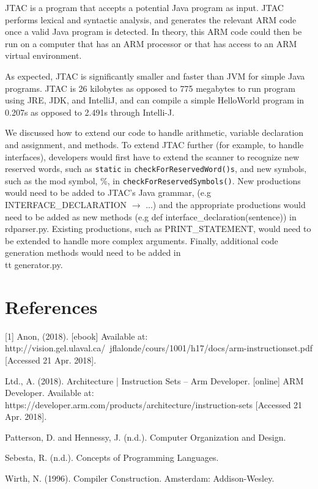 \documentclass[11pt]{article}
\begin{document}
JTAC is a program that accepts a potential Java program as input. JTAC performs lexical and syntactic analysis, and generates the relevant ARM code once a valid Java program is detected. In theory, this ARM code could then be run on a computer that has an ARM processor or that has access to an ARM virtual environment.

\bigskip
As expected, JTAC is significantly smaller and faster than JVM for simple Java programs. JTAC is 26 kilobytes as opposed to 775 megabytes to run program using JRE, JDK, and IntelliJ, and can compile a simple HelloWorld program in 0.207s as opposed to 2.491s through Intelli-J.

\bigskip
We discussed how to extend our code to handle arithmetic, variable declaration and assignment, and methods. To extend JTAC further (for example, to handle interfaces), developers would first have to extend the scanner to recognize new reserved words, such as {\tt static} in {\tt checkForReservedWord()s}, and new symbols, such as the mod symbol, \%, in {\tt checkForReservedSymbols()}. New productions would need to be added to JTAC’s Java grammar, (e.g INTERFACE\_DECLARATION $\rightarrow$ ...) and the appropriate productions would need to be added as new methods (e.g def interface\_declaration(sentence)) in rdparser.py. Existing productions, such as PRINT\_STATEMENT, would need to be extended to handle more complex arguments. Finally, additional code generation methods would need to be added in {\\tt generator.py}.

\newpage
\newpage

\section*{References}

[1] Anon, (2018). [ebook] Available at: http://vision.gel.ulaval.ca/~jflalonde/cours/1001/h17/docs/arm-instructionset.pdf [Accessed 21 Apr. 2018].

\bigskip
[2] Ltd., A. (2018). Architecture | Instruction Sets – Arm Developer. [online] ARM Developer. Available at: https://developer.arm.com/products/architecture/instruction-sets [Accessed 21 Apr. 2018].

\bigskip
[3] Patterson, D. and Hennessy, J. (n.d.). Computer Organization and Design.

\bigskip
[4] Sebesta, R. (n.d.). Concepts of Programming Languages.

\bigskip
[5] Wirth, N. (1996). Compiler Construction. Amsterdam: Addison-Wesley.
\end{document}
